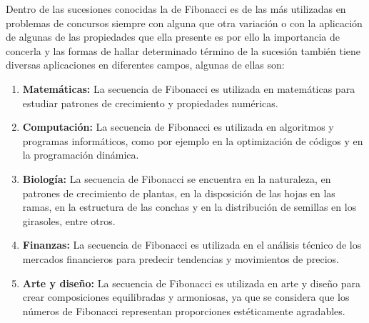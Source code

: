 Dentro de las sucesiones conocidas la de Fibonacci es de las más utilizadas en  problemas de concursos siempre con alguna que otra variación o con la aplicación de algunas de las propiedades que ella presente es por ello la importancia de concerla y las formas de hallar determinado término de la sucesión también tiene diversas aplicaciones en diferentes campos, algunas de ellas son:
\begin{enumerate}
	\item \textbf{Matemáticas:} La secuencia de Fibonacci es utilizada en matemáticas para estudiar patrones de crecimiento y propiedades numéricas.
	\item \textbf{Computación:} La secuencia de Fibonacci es utilizada en algoritmos y programas informáticos, como por ejemplo en la optimización de códigos y en la programación dinámica.
	\item \textbf{Biología:} La secuencia de Fibonacci se encuentra en la naturaleza, en patrones de crecimiento de plantas, en la disposición de las hojas en las ramas, en la estructura de las conchas y en la distribución de semillas en los girasoles, entre otros.
	\item \textbf{Finanzas:} La secuencia de Fibonacci es utilizada en el análisis técnico de los mercados financieros para predecir tendencias y movimientos de precios.
	\item \textbf{Arte y diseño:} La secuencia de Fibonacci es utilizada en arte y diseño para crear composiciones equilibradas y armoniosas, ya que se considera que los números de Fibonacci representan proporciones estéticamente agradables.
\end{enumerate}
